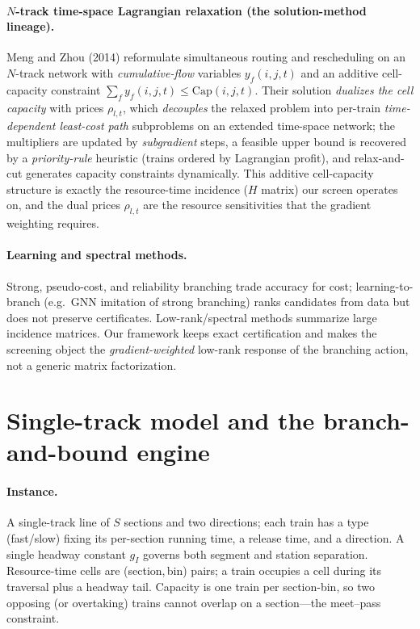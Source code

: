 \documentclass[11pt]{article}
\begin{document}
\paragraph{$N$-track time-space Lagrangian relaxation (the solution-method lineage).}
Meng and Zhou (2014) reformulate simultaneous routing and rescheduling on an $N$-track
network with \emph{cumulative-flow} variables $y_f(i,j,t)$ and an additive cell-capacity
constraint $\sum_f y_f(i,j,t)\le \mathrm{Cap}(i,j,t)$. Their solution \emph{dualizes the cell
capacity} with prices $\rho_{l,t}$, which \emph{decouples} the relaxed problem into per-train
\emph{time-dependent least-cost path} subproblems on an extended time-space network; the
multipliers are updated by \emph{subgradient} steps, a feasible upper bound is recovered by a
\emph{priority-rule} heuristic (trains ordered by Lagrangian profit), and relax-and-cut
generates capacity constraints dynamically. This additive cell-capacity structure is exactly
the resource-time incidence ($H$ matrix) our screen operates on, and the dual prices
$\rho_{l,t}$ are the resource sensitivities that the gradient weighting requires.

\paragraph{Learning and spectral methods.} Strong, pseudo-cost, and reliability branching
trade accuracy for cost; learning-to-branch (e.g.\ GNN imitation of strong branching) ranks
candidates from data but does not preserve certificates. Low-rank/spectral methods summarize
large incidence matrices. Our framework keeps exact certification and makes the screening
object the \emph{gradient-weighted} low-rank response of the branching action, not a generic
matrix factorization.

\section{Single-track model and the branch-and-bound engine}\label{sec:bb}
\paragraph{Instance.} A single-track line of $S$ sections and two directions; each train has a
type (fast/slow) fixing its per-section running time, a release time, and a direction. A
single headway constant $g_I$ governs both segment and station separation. Resource-time
cells are (section,\,bin) pairs; a train occupies a cell during its traversal plus a headway
tail. Capacity is one train per section-bin, so two opposing (or overtaking) trains cannot
overlap on a section---the meet--pass constraint.
\end{document}
